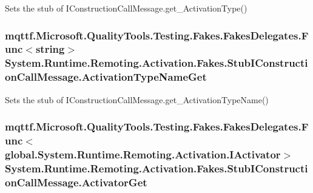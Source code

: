 Sets the stub of I\-Construction\-Call\-Message.\-get\-\_\-\-Activation\-Type()

\hypertarget{class_system_1_1_runtime_1_1_remoting_1_1_activation_1_1_fakes_1_1_stub_i_construction_call_message_a7e105d2bdb44f5a4853c8695df76c2ae}{
\subsubsection[{Activation\-Type\-Name\-Get}]{\setlength{\rightskip}{0pt plus 5cm}mqttf.\-Microsoft.\-Quality\-Tools.\-Testing.\-Fakes.\-Fakes\-Delegates.\-Func$<$string$>$ System.\-Runtime.\-Remoting.\-Activation.\-Fakes.\-Stub\-I\-Construction\-Call\-Message.\-Activation\-Type\-Name\-Get}}\label{class_system_1_1_runtime_1_1_remoting_1_1_activation_1_1_fakes_1_1_stub_i_construction_call_message_a7e105d2bdb44f5a4853c8695df76c2ae}


Sets the stub of I\-Construction\-Call\-Message.\-get\-\_\-\-Activation\-Type\-Name()

\hypertarget{class_system_1_1_runtime_1_1_remoting_1_1_activation_1_1_fakes_1_1_stub_i_construction_call_message_a2902aa62464f06db5f47aa8406d03d38}{
\subsubsection[{Activator\-Get}]{\setlength{\rightskip}{0pt plus 5cm}mqttf.\-Microsoft.\-Quality\-Tools.\-Testing.\-Fakes.\-Fakes\-Delegates.\-Func$<$global.\-System.\-Runtime.\-Remoting.\-Activation.\-I\-Activator$>$ System.\-Runtime.\-Remoting.\-Activation.\-Fakes.\-Stub\-I\-Construction\-Call\-Message.\-Activator\-Get}}\label{class_system_1_1_runtime_1_1_remoting_1_1_activation_1_1_fakes_1_1_stub_i_construction_call_message_a2902aa62464f06db5f47aa8406d03d38}


